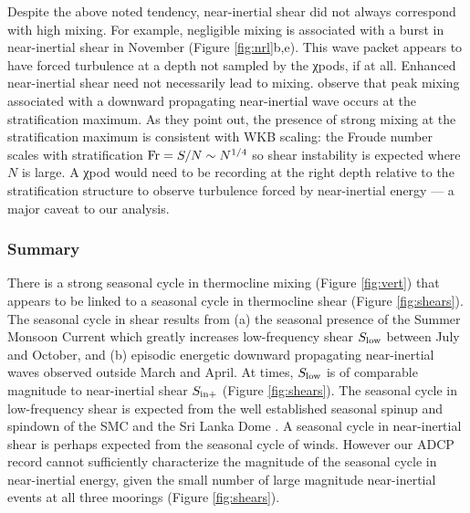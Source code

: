 \documentclass[onecol]{ametsoc}
\begin{document}
Despite the above noted tendency, near-inertial shear did not always correspond with high mixing. For example, negligible mixing is associated with a burst in near-inertial shear in November (Figure \ref{fig:nrl}b,e).
This wave packet appears to have forced turbulence at a depth not sampled by the χpods, if at all.
Enhanced near-inertial shear need not necessarily lead to mixing.
\cite{Alford2001b} observe that peak mixing associated with a downward propagating near-inertial wave occurs at the stratification maximum.
As they point out, the presence of strong mixing at the stratification maximum is consistent with WKB scaling: the Froude number scales with stratification \(\textnormal{Fr} = S/N \sim N^{1/4}\) so shear instability is expected where $N$ is large.
A χpod would need to be recording at the right depth relative to the stratification structure to observe turbulence forced by near-inertial energy --- a major caveat to our analysis.

\subsubsection*{Summary}
\label{sec:org78d8996}

There is a strong seasonal cycle in thermocline mixing (Figure \ref{fig:vert}) that appears to be linked to a seasonal cycle in thermocline shear (Figure \ref{fig:shears}).
The seasonal cycle in shear results from
(a) the seasonal presence of the Summer Monsoon Current which greatly increases low-frequency shear \(S_\text{low}\) between July and October, and
(b) episodic energetic downward propagating near-inertial waves observed outside March and April.
At times, \(S_\text{low}\) is of comparable magnitude to near-inertial shear \(S_\text{in+}\) (Figure \ref{fig:shears}).
The seasonal cycle in low-frequency shear is expected from the well established seasonal spinup and spindown of the SMC and the Sri Lanka Dome \citep{Schott2001a, Vinayachandran1998}.
A seasonal cycle in near-inertial shear is perhaps expected from the seasonal cycle of winds.
However our ADCP record cannot sufficiently characterize the magnitude of the seasonal cycle in near-inertial energy, given the small number of large magnitude near-inertial events at all three moorings (Figure \ref{fig:shears}).
\end{document}
